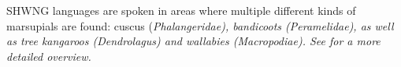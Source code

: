 SHWNG languages are spoken in areas where multiple different
kinds of marsupials are found: cuscus (\it{Phalangeridae}),
bandicoots (\it{Peramelidae}),
as well as tree kangaroos (\it{Dendrolagus}) and wallabies (\it{Macropodiae}).
See  for a more detailed overview.

%

%
